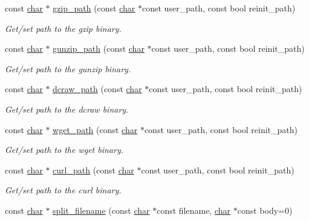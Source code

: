 \begin{DoxyCompactItemize}
const \hyperlink{classchar}{char} $\ast$ \hyperlink{namespacecimg__library__suffixed_1_1cimg_aac00308d827ccbd69bd26c9ba6e1356b}{gzip\+\_\+path} (const \hyperlink{classchar}{char} $\ast$const user\+\_\+path, const bool reinit\+\_\+path)
\begin{DoxyCompactList}\small\item\em Get/set path to the {\ttfamily gzip} binary. \end{DoxyCompactList}\item 
const \hyperlink{classchar}{char} $\ast$ \hyperlink{namespacecimg__library__suffixed_1_1cimg_a7b4390d7bec2ffbf27d108f1c3a699e0}{gunzip\+\_\+path} (const \hyperlink{classchar}{char} $\ast$const user\+\_\+path, const bool reinit\+\_\+path)
\begin{DoxyCompactList}\small\item\em Get/set path to the {\ttfamily gunzip} binary. \end{DoxyCompactList}\item 
const \hyperlink{classchar}{char} $\ast$ \hyperlink{namespacecimg__library__suffixed_1_1cimg_ad2459563e2ed326f303b9ac4e91744b0}{dcraw\+\_\+path} (const \hyperlink{classchar}{char} $\ast$const user\+\_\+path, const bool reinit\+\_\+path)
\begin{DoxyCompactList}\small\item\em Get/set path to the {\ttfamily dcraw} binary. \end{DoxyCompactList}\item 
const \hyperlink{classchar}{char} $\ast$ \hyperlink{namespacecimg__library__suffixed_1_1cimg_a36ccf2e6a6542f4e93eac819cf5d91ba}{wget\+\_\+path} (const \hyperlink{classchar}{char} $\ast$const user\+\_\+path, const bool reinit\+\_\+path)
\begin{DoxyCompactList}\small\item\em Get/set path to the {\ttfamily wget} binary. \end{DoxyCompactList}\item 
const \hyperlink{classchar}{char} $\ast$ \hyperlink{namespacecimg__library__suffixed_1_1cimg_aebd4f990c3e148573c96c04dbfdcc5c6}{curl\+\_\+path} (const \hyperlink{classchar}{char} $\ast$const user\+\_\+path, const bool reinit\+\_\+path)
\begin{DoxyCompactList}\small\item\em Get/set path to the {\ttfamily curl} binary. \end{DoxyCompactList}\item 
const \hyperlink{classchar}{char} $\ast$ \hyperlink{namespacecimg__library__suffixed_1_1cimg_a61e1cd854cf93fdf3f6d06525e1590c5}{split\+\_\+filename} (const \hyperlink{classchar}{char} $\ast$const filename, \hyperlink{classchar}{char} $\ast$const body=0)

\end{DoxyCompactItemize}
